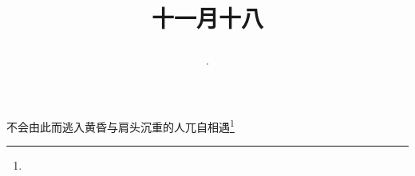 \title{\date[d=18,m=12,y=2024][year:cn-y,年,month:cn,day:cn,日,·,weekday]·十一月十八 }
不会由此而逃入黄昏与肩头沉重的人兀自相遇\footnote{ }

